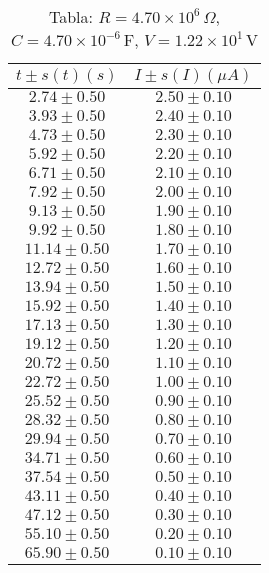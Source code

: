 \begin{table}[H]
\centering
\setlength{\arrayrulewidth}{1.2pt}
\begin{tabular}{|c|c|}
\hline
$t \pm s(t) (s)$ & $I \pm s(I) (\mu A)$ \\
\hline
$2.74 \pm 0.50$ & $2.50 \pm 0.10$ \\
$3.93 \pm 0.50$ & $2.40 \pm 0.10$ \\
$4.73 \pm 0.50$ & $2.30 \pm 0.10$ \\
$5.92 \pm 0.50$ & $2.20 \pm 0.10$ \\
$6.71 \pm 0.50$ & $2.10 \pm 0.10$ \\
$7.92 \pm 0.50$ & $2.00 \pm 0.10$ \\
$9.13 \pm 0.50$ & $1.90 \pm 0.10$ \\
$9.92 \pm 0.50$ & $1.80 \pm 0.10$ \\
$11.14 \pm 0.50$ & $1.70 \pm 0.10$ \\
$12.72 \pm 0.50$ & $1.60 \pm 0.10$ \\
$13.94 \pm 0.50$ & $1.50 \pm 0.10$ \\
$15.92 \pm 0.50$ & $1.40 \pm 0.10$ \\
$17.13 \pm 0.50$ & $1.30 \pm 0.10$ \\
$19.12 \pm 0.50$ & $1.20 \pm 0.10$ \\
$20.72 \pm 0.50$ & $1.10 \pm 0.10$ \\
$22.72 \pm 0.50$ & $1.00 \pm 0.10$ \\
$25.52 \pm 0.50$ & $0.90 \pm 0.10$ \\
$28.32 \pm 0.50$ & $0.80 \pm 0.10$ \\
$29.94 \pm 0.50$ & $0.70 \pm 0.10$ \\
$34.71 \pm 0.50$ & $0.60 \pm 0.10$ \\
$37.54 \pm 0.50$ & $0.50 \pm 0.10$ \\
$43.11 \pm 0.50$ & $0.40 \pm 0.10$ \\
$47.12 \pm 0.50$ & $0.30 \pm 0.10$ \\
$55.10 \pm 0.50$ & $0.20 \pm 0.10$ \\
$65.90 \pm 0.50$ & $0.10 \pm 0.10$ \\
\hline
\end{tabular}
\caption*{Tabla: $R = 4.70 \times 10^{6}\,\Omega$, $C = 4.70 \times 10^{-6}$\,F, $V = 1.22 \times 10^{1}$\,V}
\end{table}
